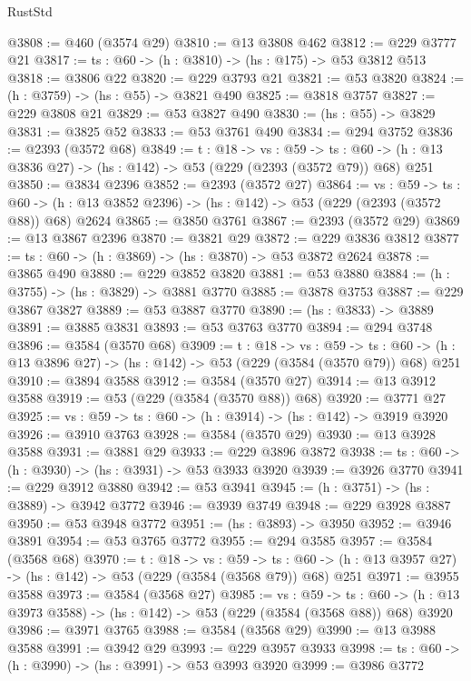 \begin{lexlean}{RustStd}
\begin{coremodule}
@3808 := @460 (@3574 @29)
@3810 := @13 @3808 @462
@3812 := @229 @3777 @21
@3817 := {ts : @60} -> (h : @3810) -> (hs : @175) -> @53 @3812 @513
@3818 := @3806 @22
@3820 := @229 @3793 @21
@3821 := @53 @3820
@3824 := (h : @3759) -> (hs : @55) -> @3821 @490
@3825 := @3818 @3757
@3827 := @229 @3808 @21
@3829 := @53 @3827 @490
@3830 := (hs : @55) -> @3829
@3831 := @3825 @52
@3833 := @53 @3761 @490
@3834 := @294 @3752
@3836 := @2393 (@3572 @68)
@3849 := {t : @18} ->
  {vs : @59} ->
  {ts : @60} -> (h : @13 @3836 @27) -> (hs : @142) -> @53 (@229 (@2393 (@3572 @79)) @68) @251
@3850 := @3834 @2396
@3852 := @2393 (@3572 @27)
@3864 := {vs : @59} ->
  {ts : @60} -> (h : @13 @3852 @2396) -> (hs : @142) -> @53 (@229 (@2393 (@3572 @88)) @68) @2624
@3865 := @3850 @3761
@3867 := @2393 (@3572 @29)
@3869 := @13 @3867 @2396
@3870 := @3821 @29
@3872 := @229 @3836 @3812
@3877 := {ts : @60} -> (h : @3869) -> (hs : @3870) -> @53 @3872 @2624
@3878 := @3865 @490
@3880 := @229 @3852 @3820
@3881 := @53 @3880
@3884 := (h : @3755) -> (hs : @3829) -> @3881 @3770
@3885 := @3878 @3753
@3887 := @229 @3867 @3827
@3889 := @53 @3887 @3770
@3890 := (hs : @3833) -> @3889
@3891 := @3885 @3831
@3893 := @53 @3763 @3770
@3894 := @294 @3748
@3896 := @3584 (@3570 @68)
@3909 := {t : @18} ->
  {vs : @59} ->
  {ts : @60} -> (h : @13 @3896 @27) -> (hs : @142) -> @53 (@229 (@3584 (@3570 @79)) @68) @251
@3910 := @3894 @3588
@3912 := @3584 (@3570 @27)
@3914 := @13 @3912 @3588
@3919 := @53 (@229 (@3584 (@3570 @88)) @68)
@3920 := @3771 @27
@3925 := {vs : @59} -> {ts : @60} -> (h : @3914) -> (hs : @142) -> @3919 @3920
@3926 := @3910 @3763
@3928 := @3584 (@3570 @29)
@3930 := @13 @3928 @3588
@3931 := @3881 @29
@3933 := @229 @3896 @3872
@3938 := {ts : @60} -> (h : @3930) -> (hs : @3931) -> @53 @3933 @3920
@3939 := @3926 @3770
@3941 := @229 @3912 @3880
@3942 := @53 @3941
@3945 := (h : @3751) -> (hs : @3889) -> @3942 @3772
@3946 := @3939 @3749
@3948 := @229 @3928 @3887
@3950 := @53 @3948 @3772
@3951 := (hs : @3893) -> @3950
@3952 := @3946 @3891
@3954 := @53 @3765 @3772
@3955 := @294 @3585
@3957 := @3584 (@3568 @68)
@3970 := {t : @18} ->
  {vs : @59} ->
  {ts : @60} -> (h : @13 @3957 @27) -> (hs : @142) -> @53 (@229 (@3584 (@3568 @79)) @68) @251
@3971 := @3955 @3588
@3973 := @3584 (@3568 @27)
@3985 := {vs : @59} ->
  {ts : @60} -> (h : @13 @3973 @3588) -> (hs : @142) -> @53 (@229 (@3584 (@3568 @88)) @68) @3920
@3986 := @3971 @3765
@3988 := @3584 (@3568 @29)
@3990 := @13 @3988 @3588
@3991 := @3942 @29
@3993 := @229 @3957 @3933
@3998 := {ts : @60} -> (h : @3990) -> (hs : @3991) -> @53 @3993 @3920
@3999 := @3986 @3772

\end{coremodule}
\end{lexlean}
